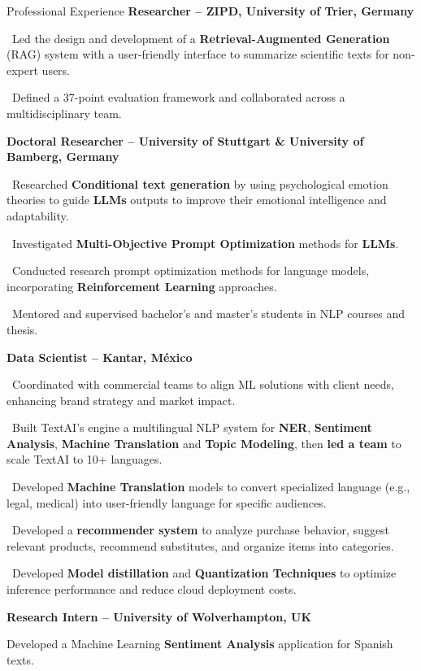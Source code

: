 \begin{rubric}{Professional Experience}
\entry*[02.2025 -- Present]%
\textbf{Researcher -- ZIPD, University of Trier, Germany}

\textbullet~Led the design and development of a \textbf{Retrieval-Augmented Generation} (RAG) system with a user-friendly interface to summarize scientific texts for non-expert users.\par\par
\textbullet~Defined a 37-point evaluation framework and collaborated across a multidisciplinary team.\par\par

\entry*[04.2022 -- 01.2025]%
	\textbf{Doctoral Researcher -- University of Stuttgart \& University of Bamberg, Germany}
	
\textbullet~Researched \textbf{Conditional text generation} by using psychological emotion theories to guide \textbf{LLMs} outputs to improve their emotional intelligence and adaptability.\par

 \textbullet~Investigated \textbf{Multi-Objective Prompt Optimization} methods for \textbf{LLMs}.\par

 \textbullet~Conducted research prompt optimization methods for language models, incorporating \textbf{Reinforcement Learning} approaches.\par
 
\textbullet~Mentored and supervised bachelor’s and master’s students in NLP courses and thesis.\par

\entry*[06.2018 -- 09.2021]%
	\textbf{Data Scientist -- Kantar, México}
	
	\textbullet~Coordinated with commercial teams to align ML solutions with client needs, enhancing brand strategy and market impact.\par
%
\textbullet~Built TextAI’s engine a multilingual NLP system for \textbf{NER}, \textbf{Sentiment Analysis}, \textbf{Machine Translation} and \textbf{Topic Modeling}, then \textbf{led a team} to scale TextAI to 10+ languages.
\par

\textbullet~Developed \textbf{Machine Translation} models to convert specialized language (e.g., legal, medical) into user-friendly language for specific audiences.

\textbullet~Developed a \textbf{recommender system} to analyze purchase behavior, suggest relevant products, recommend substitutes, and organize items into categories.\par
\textbullet~Developed \textbf{Model distillation} and \textbf{Quantization Techniques} to optimize inference performance and reduce cloud deployment costs.

%
%
\entry*[02.2017 -- 08.2017]%
	\textbf{Research Intern -- University of Wolverhampton, UK}
 
 Developed a Machine Learning \textbf{Sentiment Analysis} application for Spanish texts.
%
\end{rubric}